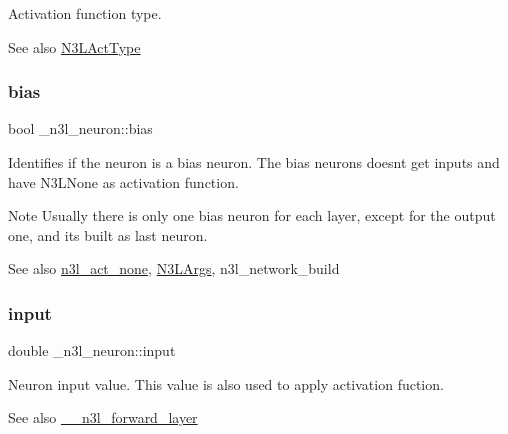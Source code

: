 Activation function type. \begin{DoxySeeAlso}{See also}
\hyperlink{n3__header_8h_a3118e8995213ca26bd388c3d94cd8056}{N3\+L\+Act\+Type} 
\end{DoxySeeAlso}
\mbox{\label{struct__n3l__neuron_a0f3291ff81ab13111e538622ab662069}} 
\subsubsection{\texorpdfstring{bias}{bias}}
{\footnotesize\ttfamily bool \+\_\+n3l\+\_\+neuron\+::bias}

Identifies if the neuron is a bias neuron. The bias neurons doesn\textquotesingle{}t get inputs and have N3\+L\+None as activation function. \begin{DoxyNote}{Note}
Usually there is only one bias neuron for each layer, except for the output one, and it\textquotesingle{}s built as last neuron.
\end{DoxyNote}
\begin{DoxySeeAlso}{See also}
\hyperlink{n3__act_8c_a8dc073371b15e2574897762b54f9326c}{n3l\+\_\+act\+\_\+none}, \hyperlink{structN3LArgs}{N3\+L\+Args}, n3l\+\_\+network\+\_\+build 
\end{DoxySeeAlso}
\mbox{\label{struct__n3l__neuron_ac896f5f8bd82c056cc61872120391048}} 
\subsubsection{\texorpdfstring{input}{input}}
{\footnotesize\ttfamily double \+\_\+n3l\+\_\+neuron\+::input}

Neuron input value. This value is also used to apply activation fuction.

\begin{DoxySeeAlso}{See also}
\hyperlink{n3__forward_8c_a658e97e1260b05ef3d286fbe93f11a40}{\+\_\+\+\_\+n3l\+\_\+forward\+\_\+layer} 
\end{DoxySeeAlso}
\mbox{\label{struct__n3l__neuron_a55f1bc3d589d69c5a940d0cb497610c4}} 
